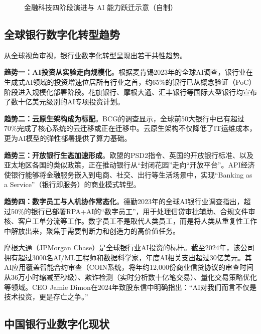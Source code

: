 \begin{figure}[H]
\caption{金融科技四阶段演进与 AI 能力跃迁示意（自制）}
\label{fig:fintech-stages}
\end{figure}

\subsection{全球银行数字化转型趋势}

从全球视角审视，银行业数字化转型呈现出若干共性趋势。

\textbf{趋势一：AI投资从实验走向规模化}。根据麦肯锡2023年的全球AI调查，银行业在生成式AI领域的投资增速位居所有行业之首，约65\%的银行已从概念验证（PoC）阶段进入规模化部署阶段\parencite{mckinsey2023ai}。花旗银行、摩根大通、汇丰银行等国际大型银行均宣布了数十亿美元级别的AI专项投资计划。

\textbf{趋势二：云原生架构成为标配}。BCG的调查显示，全球前50大银行中已有超过70\%完成了核心系统的云迁移或正在迁移中\parencite{bcg2023retail}。云原生架构不仅降低了IT运维成本，更为AI模型的弹性部署提供了算力基础。

\textbf{趋势三：开放银行生态加速形成}。欧盟的PSD2指令、英国的开放银行标准、以及亚太地区各国的类似政策，正在推动银行从``封闭花园''走向``开放平台''。API经济使银行能够将金融服务嵌入到电商、社交、出行等生活场景中，实现``Banking as a Service''（银行即服务）的商业模式转型。

\textbf{趋势四：数字员工与人机协作常态化}。德勤2023年的全球AI银行业调查指出，超过50\%的银行已部署RPA+AI的``数字员工''，用于处理信贷审批辅助、合规文件审核、客户工单分流等工作\parencite{deloitte2023banking}。数字员工不是取代人类员工，而是将人类从重复性工作中解放出来，聚焦于需要判断力和创造力的高价值任务。

\begin{casebox}[案例：摩根大通的AI战略]
摩根大通（JPMorgan Chase）是全球银行业AI投资的标杆。截至2024年，该公司拥有超过3000名AI/ML工程师和数据科学家，年度AI相关支出超过30亿美元。其AI应用覆盖智能合约审查（COIN系统，将年约12,000份商业信贷协议的审查时间从36万小时缩减至秒级）、欺诈检测（实时分析数十亿笔交易）、量化交易策略优化等领域。CEO Jamie Dimon在2024年致股东信中明确指出：``AI对我们而言不仅是技术投资，更是存亡之争。''
\end{casebox}

\subsection{中国银行业数字化现状}

